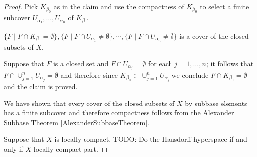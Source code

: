 \begin{proof}
Pick $K_{\beta_0}$ as in the claim and use the compactness of $K_{\beta_0}$ to select a finite subcover $U_{\alpha_1}, \dotsc, U_{\alpha_n}$ of $K_{\beta_0}$.
\begin{clm} $\lbrace F \mid F \cap K_{\beta_0} = \emptyset \rbrace, \lbrace F \mid F \cap U_{\alpha_1} \neq \emptyset \rbrace, \cdots , \lbrace F \mid F \cap U_{\alpha_n} \neq \emptyset \rbrace$ is a cover of the closed subsets of $X$.
\end{clm} 
Suppose that $F$ is a closed set and $F \cap U_{\alpha_j} = \emptyset$ for each $j=1, \dotsc, n$; it follows that $F \cap \cup_{j=1}^n U_{\alpha_j}  = \emptyset$ and therefore since $K_{\beta_0} \subset \cup_{j=1}^n U_{\alpha_j}$ we conclude $F \cap K_{\beta_0} = \emptyset$ and the claim is proved.

We have shown that every cover of the closed subsets of $X$ by subbase elements has a finite subcover and therefore compactness follows from the Alexander Subbase Theorem \ref{AlexanderSubbaseTheorem}.



Suppose that $X$ is locally compact. 
TODO: Do the Hausdorff hyperspace if and only if $X$ locally compact part.
\end{proof}

